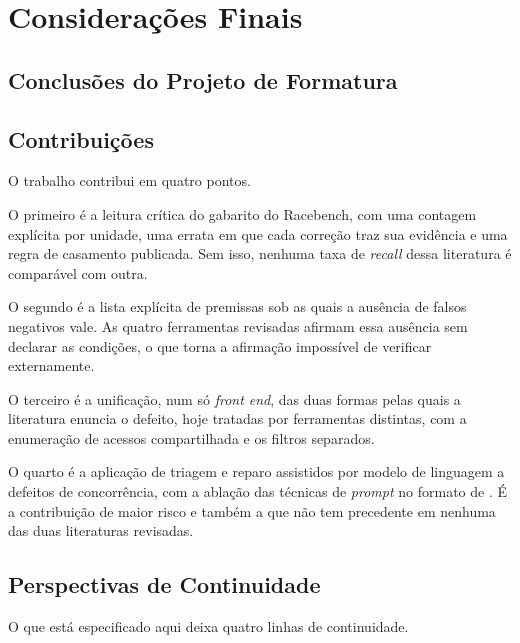 \chapter{Considerações Finais} \label{cap:consideracoes}

\section{Conclusões do Projeto de Formatura}
\label{sec:conclusoes}


\section{Contribuições}
\label{sec:contribuicoes}

O trabalho contribui em quatro pontos.

O primeiro é a leitura crítica do gabarito do Racebench, com uma contagem
explícita por unidade, uma errata em que cada correção traz sua evidência e uma
regra de casamento publicada. Sem isso, nenhuma taxa de \textit{recall} dessa literatura
é comparável com outra.

O segundo é a lista explícita de premissas sob as quais a ausência de falsos
negativos vale. As quatro ferramentas revisadas afirmam essa ausência sem
declarar as condições, o que torna a afirmação impossível de verificar
externamente.

O terceiro é a unificação, num só \textit{front end}, das duas formas pelas
quais a literatura enuncia o defeito, hoje tratadas por ferramentas distintas,
com a enumeração de acessos compartilhada e os filtros separados.

O quarto é a aplicação de triagem e reparo assistidos por modelo de linguagem a
defeitos de concorrência, com a ablação das técnicas de \textit{prompt} no
formato de . É a contribuição de maior risco e também a que
não tem precedente em nenhuma das duas literaturas revisadas.

\section{Perspectivas de Continuidade}
\label{sec:continuidade}

O que está especificado aqui deixa quatro linhas de continuidade.

